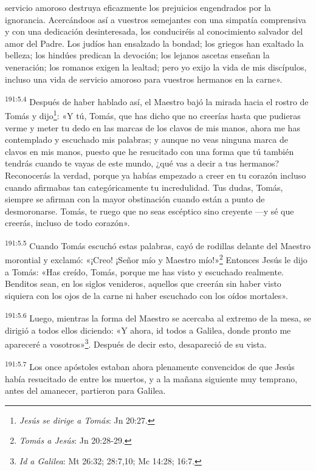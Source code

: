 servicio amoroso destruya eficazmente los prejuicios engendrados por la ignorancia. Acercándoos así a vuestros semejantes con una simpatía comprensiva y con una dedicación desinteresada, los conduciréis al conocimiento salvador del amor del Padre. Los judíos han ensalzado la bondad; los griegos han exaltado la belleza; los hindúes predican la devoción; los lejanos ascetas enseñan la veneración; los romanos exigen la lealtad; pero yo exijo la vida de mis discípulos, incluso una vida de servicio amoroso para vuestros hermanos en la carne».

\par
\textsuperscript{191:5.4} Después de haber hablado así, el Maestro bajó la mirada hacia el rostro de Tomás y dijo\footnote{\textit{Jesús se dirige a Tomás}: Jn 20:27.}: «Y tú, Tomás, que has dicho que no creerías hasta que pudieras verme y meter tu dedo en las marcas de los clavos de mis manos, ahora me has contemplado y escuchado mis palabras; y aunque no veas ninguna marca de clavos en mis manos, puesto que he resucitado con una forma que tú también tendrás cuando te vayas de este mundo, ¿qué vas a decir a tus hermanos? Reconocerás la verdad, porque ya habías empezado a creer en tu corazón incluso cuando afirmabas tan categóricamente tu incredulidad. Tus dudas, Tomás, siempre se afirman con la mayor obstinación cuando están a punto de desmoronarse. Tomás, te ruego que no seas escéptico sino creyente ---y sé que creerás, incluso de todo corazón».

\par
\textsuperscript{191:5.5} Cuando Tomás escuchó estas palabras, cayó de rodillas delante del Maestro morontial y exclamó: «¡Creo! ¡Señor mío y Maestro mío!»\footnote{\textit{Tomás a Jesús}: Jn 20:28-29.} Entonces Jesús le dijo a Tomás: «Has creído, Tomás, porque me has visto y escuchado realmente. Benditos sean, en los siglos venideros, aquellos que creerán sin haber visto siquiera con los ojos de la carne ni haber escuchado con los oídos mortales».

\par
\textsuperscript{191:5.6} Luego, mientras la forma del Maestro se acercaba al extremo de la mesa, se dirigió a todos ellos diciendo: «Y ahora, id todos a Galilea, donde pronto me apareceré a vosotros»\footnote{\textit{Id a Galilea}: Mt 26:32; 28:7,10; Mc 14:28; 16:7.}. Después de decir esto, desapareció de su vista.

\par
\textsuperscript{191:5.7} Los once apóstoles estaban ahora plenamente convencidos de que Jesús había resucitado de entre los muertos, y a la mañana siguiente muy temprano, antes del amanecer, partieron para Galilea.

